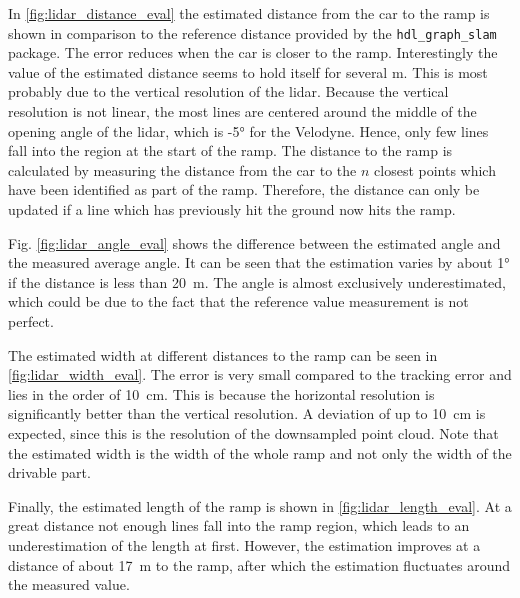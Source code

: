 In \cref{fig:lidar_distance_eval} the estimated distance from the car to the ramp is shown in comparison to the reference distance provided by the \texttt{hdl\_graph\_slam} package.
The error reduces when the car is closer to the ramp.
Interestingly the value of the estimated distance seems to hold itself for several \si{\metre}.
This is most probably due to the vertical resolution of the \gls{lidar}.
Because the vertical resolution is not linear, the most lines are centered around the middle of the opening angle of the \gls{lidar}, which is -\ang{5} for the Velodyne.
Hence, only few lines fall into the region at the start of the ramp.
The distance to the ramp is calculated by measuring the distance from the car to the $n$ closest points which have been identified as part of the ramp.
Therefore, the distance can only be updated if a line which has previously hit the ground now hits the ramp.\par
Fig. \ref{fig:lidar_angle_eval} shows the difference between the estimated angle and the measured average angle.
It can be seen that the estimation varies by about \ang{1} if the distance is less than \SI{20}{\metre}.
The angle is almost exclusively underestimated, which could be due to the fact that the reference value measurement is not perfect.\par
The estimated width at different distances to the ramp can be seen in \cref{fig:lidar_width_eval}.
The error is very small compared to the tracking error and lies in the order of \SI{10}{\cm}.
This is because the horizontal resolution is significantly better than the vertical resolution.
A deviation of up to \SI{10}{\cm} is expected, since this is the resolution of the downsampled point cloud.
Note that the estimated width is the width of the whole ramp and not only the width of the drivable part.\par
Finally, the estimated length of the ramp is shown in \cref{fig:lidar_length_eval}.
At a great distance not enough lines fall into the ramp region, which leads to an underestimation of the length at first.
However, the estimation improves at a distance of about \SI{17}{\metre} to the ramp, after which the estimation fluctuates around the measured value.\par
